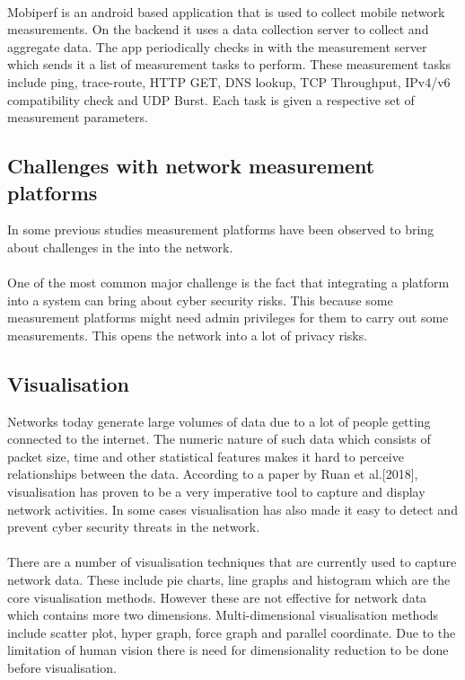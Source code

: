 \paragraph{}
Mobiperf is an android based application that is used to collect mobile network measurements. On the backend it uses a data collection server to collect and aggregate data. The app periodically checks in with the measurement server which sends it a list of measurement tasks to perform. These measurement tasks include ping, trace-route, HTTP GET, DNS lookup, TCP Throughput, IPv4/v6 compatibility check and UDP Burst. Each task is given a respective set of measurement parameters.

\subsection{ Challenges with network measurement platforms}
In some previous studies measurement platforms have been observed to bring about challenges in the into the network.
\paragraph{}
One of the most common major challenge is the fact that integrating a platform into a system can bring about cyber security risks. This because some measurement platforms might need admin privileges for them to carry out some measurements. This opens the network into a lot of privacy risks.

\subsection{Visualisation}
Networks today generate large volumes of data due to a lot of people getting connected to the internet. The numeric nature of such data which consists of packet size, time and other statistical features makes it hard to perceive relationships between the data\cite{Ruan2018}. According to a paper by Ruan et al.[2018], visualisation has proven to be a very imperative tool to capture and display network activities. In some cases visualisation has also made it easy to detect and prevent cyber security threats in the network\cite{inproceedings}.
\paragraph{}
There are a number of visualisation techniques that are currently used to capture network data. These include pie charts, line graphs and histogram which are the core visualisation methods. However these are not effective for network data which contains more two dimensions\cite{Ruan2018}. Multi-dimensional visualisation methods include scatter plot, hyper graph, force graph and parallel coordinate. Due to the limitation of human vision there is need for dimensionality reduction to be done before visualisation\cite{Ruan2018}. 
